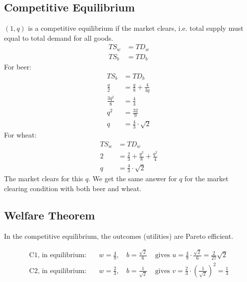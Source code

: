 \documentclass{article}
\begin{document}
\subsection*{Competitive Equilibrium}
$(1,q)$ is a competitive equilibrium if the market clears, i.e. total supply must equal to total demand for all goods.
\begin{equation*}
\begin{aligned}
    TS_w&=TD_w\\
    TS_b&=TD_b
\end{aligned}
\end{equation*}
For beer:
\begin{equation*}
    \begin{aligned}
        TS_b&=TD_b\\
        \frac{q}{2}&=\frac{q}{8}+\frac{4}{3q}\\
        \frac{3q^2}{8}&=\frac{4}{3}\\
        q^2&=\frac{32}{9}\\
        q&=\frac{4}{3}\cdot\sqrt{2}
    \end{aligned}
\end{equation*}
For wheat:
\begin{equation*}
    \begin{aligned}
        TS_w&=TD_w\\
        2&=\frac{2}{3}+\frac{q^2}{8}+\frac{q^2}{4}\\
        q&=\frac{4}{3}\cdot\sqrt{2}
    \end{aligned}
\end{equation*}
The market clears for this $q$. We get the same answer for $q$ for the market clearing condition with both beer and wheat.
\subsection*{Welfare Theorem}
In the competitive equilibrium, the outcomes (utilities) are Pareto efficient.

\begin{equation*}
    \begin{aligned}
        \text{C1, in equilibrium:}\quad& w=\frac{4}{9},\,&b=\frac{\sqrt{2}}{6}&\text{ gives }u=\frac{4}{9}\cdot\frac{\sqrt{2}}{6}=\frac{2}{27}\sqrt{2}\\
        \text{C2, in equilibrium:}\quad& w=\frac{2}{3},\,&b=\frac{1}{\sqrt{2}}&\text{ gives }v=\frac{2}{3}\cdot\left(\frac{1}{\sqrt{2}}\right)^2=\frac{1}{3}
    \end{aligned}
\end{equation*}
\end{document}
